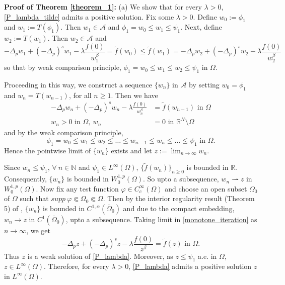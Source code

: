 \documentclass[reqno,oneside]{amsart}
\theoremstyle{definition}
\theoremstyle{remark}
\numberwithin{equation}{section}
\newcommand{\p}{\Delta_p}
\newcommand{\ps}{(-\Delta_p)^s}
\newcommand{\la} {\lambda}
\newcommand{\ba}{\beta}
\newcommand{\Om} {\Omega}
\newcommand{\sr}{\mathbb{R}}
\newcommand{\rar}{\rightarrow}
\newcommand{\wop}{W^{1,p}_0 (\Omega)}
\newcommand{\test}{C_c^{\infty} (\Om)}
\newcommand{\bdry}{\mathbb{R}^N \setminus \Omega}
\newcommand{\ftil}{\tilde{f}}
\newcommand{\sn}{\mathbb{N}}
\begin{document}
\noindent\textbf{Proof of Theorem \ref{theorem_1}:} (a) We show that for every $\la>0$, \eqref{P_lambda_tilde} admits a positive solution. Fix some $\la>0$. Define $w_0 := \phi_1$ and $w_1 := T(\phi_1)$. Then $w_1 \in \mathcal{A}$ and $\phi_1 = w_0 \leq w_1 \leq \psi_1$. Next, define $w_2 := T(w_1)$. Then $w_2 \in \mathcal{A}$ and
\begin{equation*}
    -\p w_1 + \ps w_1 -\la \frac{f(0)}{w_1^{\ba}} = \ftil (w_0) \leq \ftil (w_1) = -\p w_2 + \ps w_2 -\la \frac{f(0)}{w_2^{\ba}}
\end{equation*}
so that by weak comparison principle, $\phi_1 = w_0 \leq w_1 \leq w_2 \leq \psi_1$ in $\Om$.

Proceeding in this way, we construct a sequence $\{w_n\}$ in $\mathcal{A}$ by setting $w_0 = \phi_1$ and $w_n = T(w_{n-1})$, for all $n\geq 1$. Then we have
\begin{equation}\label{monotone_iteration}
    \begin{aligned}
        -\p w_n + \ps w_n -\la \frac{f(0)}{w_n^{\ba}} &= \ftil (w_{n-1}) \text{ in } \Om\\
        w_n >0 \text{ in } \Om,\ w_n &=0 \text{ in } \bdry
    \end{aligned}
\end{equation}
and by the weak comparison principle,
\[ \phi_1 = w_0 \leq w_1 \leq w_2 \leq \dots \leq w_{n-1} \leq w_n \leq \dots \leq \psi_1 \text{ in } \Om.\]
Hence the pointwise limit of $\{w_n\}$ exists and let $z:= \lim_{n\rar\infty} w_n$.

Since $w_n \leq \psi_1$, $\forall\ n\in\sn$ and $\psi_1\in L^{\infty}(\Om)$, $\{\ftil (w_n)\}_{n\geq 0}$ is bounded in $\sr$. Consequently, $\{w_n\}$ is bounded in $\wop$. So upto a subsequence, $w_n \rightharpoonup z$ in $\wop$. Now fix any test function $\varphi\in \test$ and choose an open subset $\Om_0$ of $\Om$ such that $supp\ \varphi \Subset \Om_0 \Subset \Om$. Then by the interior regularity result (Theorem 5) of \cite{de2024gradient}, $\{ w_n\}$ is bounded in $C^{1,\alpha} (\overline{\Om}_0)$ and due to the compact embedding, $w_n \rar z$ in $C^1 (\overline{\Om}_0)$, upto a subsequence. Taking limit in \eqref{monotone_iteration} as $n\rar\infty$, we get
\begin{equation*}
    -\p z + \ps z -\la \frac{f(0)}{z^{\ba}} = \ftil (z) \text{ in } \Om.
\end{equation*}
Thus $z$ is a weak solution of \eqref{P_lambda}. Moreover, as $z \leq \psi_1$ a.e. in $\Om$, $z\in L^{\infty} (\Om)$. Therefore, for every $\la>0$, \eqref{P_lambda} admits a positive solution $z$ in $L^{\infty} (\Om)$.
\end{document}
